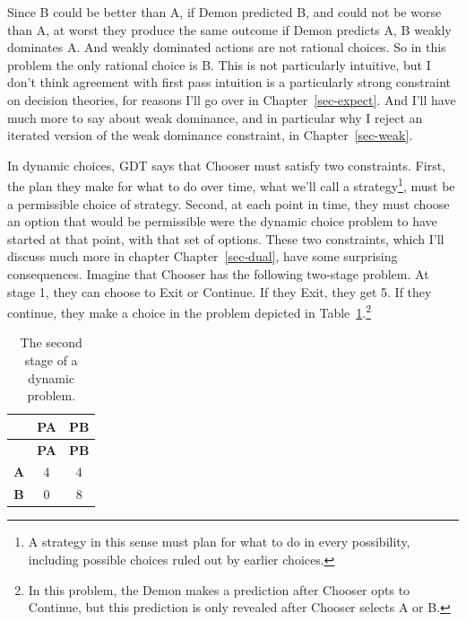\documentclass[
  12pt,
  letterpaper,
  DIV=11,
  numbers=noendperiod]{scrreprt}
\begin{document}
Since B could be better than A, if Demon predicted B, and could not be
worse than A, at worst they produce the same outcome if Demon predicts
A, B weakly dominates A. And weakly dominated actions are not rational
choices. So in this problem the only rational choice is B. This is not
particularly intuitive, but I don't think agreement with first pass
intuition is a particularly strong constraint on decision theories, for
reasons I'll go over in Chapter~\ref{sec-expect}. And I'll have much
more to say about weak dominance, and in particular why I reject an
iterated version of the weak dominance constraint, in
Chapter~\ref{sec-weak}.

In dynamic choices, GDT says that Chooser must satisfy two constraints.
First, the plan they make for what to do over time, what we'll call a
strategy\footnote{A strategy in this sense must plan for what to do in
  every possibility, including possible choices ruled out by earlier
  choices.}, must be a permissible choice of strategy. Second, at each
point in time, they must choose an option that would be permissible were
the dynamic choice problem to have started at that point, with that set
of options. These two constraints, which I'll discuss much more in
chapter Chapter~\ref{sec-dual}, have some surprising consequences.
Imagine that Chooser has the following two-stage problem. At stage 1,
they can choose to Exit or Continue. If they Exit, they get 5. If they
continue, they make a choice in the problem depicted in
Table~\ref{tbl-first-dynamic-example}.\footnote{In this problem, the
  Demon makes a prediction after Chooser opts to Continue, but this
  prediction is only revealed after Chooser selects A or B.}

\hypertarget{tbl-first-dynamic-example}{}
\begin{longtable}[]{@{}ccc@{}}
\caption{\label{tbl-first-dynamic-example}The second stage of a dynamic
problem.}\tabularnewline
\toprule\noalign{}
& \textbf{PA} & \textbf{PB} \\
\midrule\noalign{}
\endfirsthead
\toprule\noalign{}
& \textbf{PA} & \textbf{PB} \\
\midrule\noalign{}
\endhead
\bottomrule\noalign{}
\endlastfoot
\textbf{A} & 4 & 4 \\
\textbf{B} & 0 & 8 \\
\end{longtable}
\end{document}
